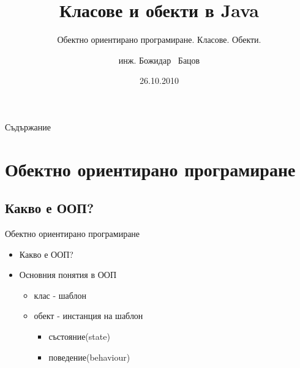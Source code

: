 \documentclass{beamer}
\title{Класове и обекти в Java}
\subtitle
{Обектно ориентирано програмиране. Класове. Обекти.}
\author{инж. Божидар ~Бацов}
\institute{Drow Ltd.}
\date{26.10.2010}
\begin{document}
\begin{frame}
  \titlepage
\end{frame}

\begin{frame}{Съдържание}
  \tableofcontents
\end{frame}




\section{Обектно ориентирано програмиране}

\subsection{Какво е ООП?}

\begin{frame}{Обектно ориентирано програмиране}
  \transdissolve
  \begin{itemize}
  \item Какво е ООП?
  \item Основния понятия в ООП
    \begin{itemize}
      \item клас - шаблон
      \item обект - инстанция на шаблон
        \begin{itemize}
          \item състояние(state)
          \item поведение(behaviour)
        \end{itemize}
    \end{itemize}
  \end{itemize}
\end{frame}
\end{document}
